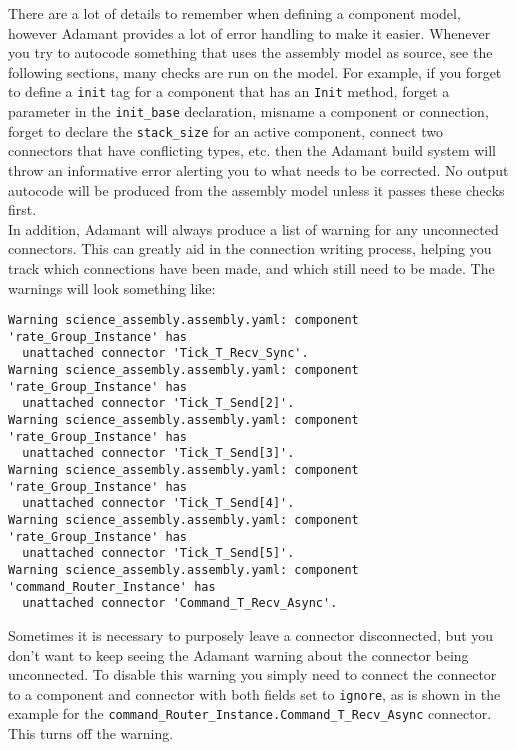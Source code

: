There are a lot of details to remember when defining a component model, however Adamant provides a lot of error handling to make it easier. Whenever you try to autocode something that uses the assembly model as source, see the following sections, many checks are run on the model. For example, if you forget to define a \texttt{init} tag for a component that has an \texttt{Init} method, forget a parameter in the \texttt{init\_base} declaration, misname a component or connection, forget to declare the \texttt{stack\_size} for an active component, connect two connectors that have conflicting types, etc. then the Adamant build system will throw an informative error alerting you to what needs to be corrected. No output autocode will be produced from the assembly model unless it passes these checks first. \\

In addition, Adamant will always produce a list of warning for any unconnected connectors. This can greatly aid in the connection writing process, helping you track which connections have been made, and which still need to be made. The warnings will look something like:

\vspace{5mm} %
\begin{verbatim}
Warning science_assembly.assembly.yaml: component 'rate_Group_Instance' has 
  unattached connector 'Tick_T_Recv_Sync'.
Warning science_assembly.assembly.yaml: component 'rate_Group_Instance' has 
  unattached connector 'Tick_T_Send[2]'.
Warning science_assembly.assembly.yaml: component 'rate_Group_Instance' has 
  unattached connector 'Tick_T_Send[3]'.
Warning science_assembly.assembly.yaml: component 'rate_Group_Instance' has 
  unattached connector 'Tick_T_Send[4]'.
Warning science_assembly.assembly.yaml: component 'rate_Group_Instance' has 
  unattached connector 'Tick_T_Send[5]'.
Warning science_assembly.assembly.yaml: component 'command_Router_Instance' has 
  unattached connector 'Command_T_Recv_Async'.
\end{verbatim}
\vspace{5mm} %

Sometimes it is necessary to purposely leave a connector disconnected, but you don't want to keep seeing the Adamant warning about the connector being unconnected. To disable this warning you simply need to connect the connector to a component and connector with both fields set to \texttt{ignore}, as is shown in the example for the \texttt{command\_Router\_Instance.Command\_T\_Recv\_Async} connector. This turns off the warning. \\

